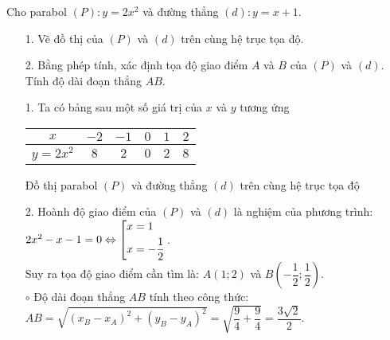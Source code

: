\begin{ex}%
Cho parabol $(P): y=2x^2$ và đường thẳng $(d): y=x+1$.
    \begin{enumerate}    
        \item[1.] Vẽ đồ thị của $(P)$ và $(d)$ trên cùng hệ trục tọa độ.
        \item[2.] Bằng phép tính, xác định tọa độ giao điểm $A$ và $B$ của $(P)$ và $(d)$. Tính độ dài đoạn thẳng $AB$.
    \end{enumerate}
\loigiai
    {
    \begin{enumerate}
        \item[1.] Ta có bảng sau một số giá trị của $x$ và $y$ tương ứng
\begin{center}
{\tabcolsep=0.4cm
\begin{tabular}{|c|c|c|c|c|c|}
\hline
$x$& $-2$& $-1$ & $0$& $1$& $2$\\
\hline
$y=2x^2$& $8$& $2$& $0$& $2$& $8$\\
\hline
\end{tabular}}
\end{center}
Đồ thị parabol $(P)$ và đường thẳng $(d)$ trên cùng hệ trục tọa độ
\begin{center}
\end{center}
	\item[2.] Hoành độ giao điểm của $(P)$ và $(d)$ là nghiệm của phương trình: $2x^2-x-1=0\Leftrightarrow\left[\begin{aligned}&x=1\\&x=-\dfrac{1}{2}\end{aligned}\right.$.\\
	Suy ra tọa độ giao điểm cần tìm là: $A\left(1;2\right)$ và $B\left(-\dfrac{1}{2};\dfrac{1}{2}\right)$.\\
	$\circ$ Độ dài đoạn thẳng $AB$ tính theo công thức:\\
	$\displaystyle AB=\sqrt{\left(x_B-x_A\right)^2+\left(y_B-y_A\right)^2}=\sqrt{\dfrac{9}{4}+\dfrac{9}{4}}=\dfrac{3\sqrt{2}}{2}$.
    \end{enumerate}
    }
\end{ex}


